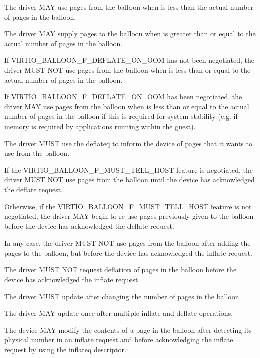 The driver MAY use pages from the balloon when  is
less than the actual number of pages in the balloon.

The driver MAY supply pages to the balloon when  is
greater than or equal to the actual number of pages in the balloon.

If VIRTIO_BALLOON_F_DEFLATE_ON_OOM has not been negotiated, the
driver MUST NOT use pages from the balloon when 
is less than or equal to the actual number of pages in the
balloon.

If VIRTIO_BALLOON_F_DEFLATE_ON_OOM has been negotiated, the
driver MAY use pages from the balloon when 
is less than or equal to the actual number of pages in the
balloon if this is required for system stability
(e.g. if memory is required by applications running within
 the guest).

The driver MUST use the deflateq to inform the device of pages that it
wants to use from the balloon.

If the VIRTIO_BALLOON_F_MUST_TELL_HOST feature is negotiated, the
driver MUST NOT use pages from the balloon until
the device has acknowledged the deflate request.

Otherwise, if the VIRTIO_BALLOON_F_MUST_TELL_HOST feature is not
negotiated, the driver MAY begin to re-use pages previously
given to the balloon before the device has acknowledged the
deflate request.

In any case, the driver MUST NOT use pages from the balloon
after adding the pages to the balloon, but before the device has
acknowledged the inflate request.

The driver MUST NOT request deflation of pages in
the balloon before the device has acknowledged the inflate
request.

The driver MUST update  after changing the number
of pages in the balloon.

The driver MAY update  once after multiple
inflate and deflate operations.


The device MAY modify the contents of a page in the balloon
after detecting its physical number in an inflate request
and before acknowledging the inflate request by using the inflateq
descriptor.

